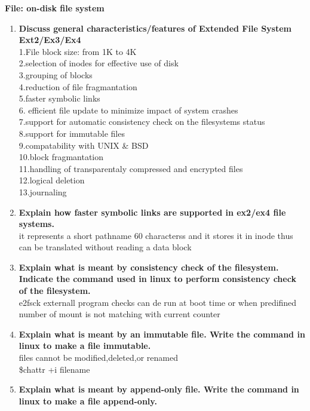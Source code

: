 \documentclass[a4paper,12pt]{article}
\begin{document}
\begin{flushleft}
\textbf{File: on-disk file system}
\begin{enumerate}
\item \textbf{ Discuss general characteristics/features of Extended File System Ext2/Ex3/Ex4}\\
{\color{red}1.File block size: from 1K to 4K\\
2.selection of inodes for effective use of disk\\
3.grouping of blocks\\
4.reduction of file fragmantation\\
5.faster symbolic links\\
6. efficient file update to minimize impact of system  crashes\\
7.support for automatic consistency check on the filesystems status\\
8.support for immutable files\\
9.compatability with UNIX \& BSD\\
10.block fragmantation\\
11.handling of transparentaly compressed and encrypted files\\
12.logical deletion\\
13.journaling}\\
\item \textbf{ Explain how faster symbolic links are supported in ex2/ex4 file systems.}\\
{\color{red}it represents a short pathname 60 characterss and it stores it in inode thus can be translated without reading a data block}\\
\item \textbf{ Explain what is meant by consistency check of the filesystem. Indicate the command used in linux to perform consistency check of the filesystem.}\\
{\color{red}e2fsck externall program checks can de run at boot time or when predifined number of mount is not matching with current counter}\\
\item \textbf{ Explain what is meant by an immutable file. Write the command in linux to make a file immutable.}\\
{\color{red}files cannot be modified,deleted,or renamed\\
\$chattr +i filename}\\
\item \textbf{ Explain what is meant by append-only file. Write the command in linux to make a file append-only.}\\

\end{enumerate}
\end{flushleft}
\end{document}
